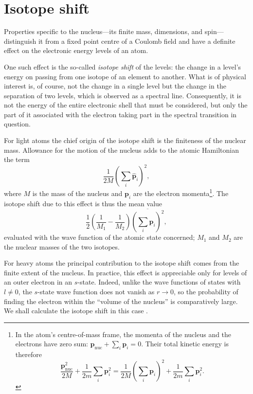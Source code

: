 \section{Isotope shift}

Properties specific to the nucleus---its finite mass, dimensions, and spin---
distinguish it from a fixed point centre of a Coulomb field and have a
definite effect on the electronic energy levels of an atom.

One such effect is the so-called \emph{isotope shift} of the levels: the change
in a level's energy on passing from one isotope of an element to another. What
is of physical interest is, of course, not the change in a single level but the
change in the separation of two levels, which is observed as a spectral line.
Consequently, it is not the energy of the entire electronic shell that must be
considered, but only the part of it associated with the electron taking part in
the spectral transition in question.

For light atoms the chief origin of the isotope shift is the finiteness of the
nuclear mass. Allowance for the motion of the nucleus adds to the atomic
Hamiltonian the term
\[
 \frac1{2M}\left(\sum_i\hat{\mathbf p}_i\right)^2,
\]
where $M$ is the mass of the nucleus and $\mathbf p_i$ are the electron
momenta\footnote{In the atom's centre-of-mass frame, the momenta of the nucleus
and the electrons have zero sum:
$\mathbf p_{\mathrm{nuc}}+\sum_i\mathbf p_i=0$. Their total kinetic energy is
therefore
\[
 \frac{\mathbf p_{\mathrm{nuc}}^2}{2M}+
 \frac1{2m}\sum_i\mathbf p_i^2
 =\frac1{2M}\left(\sum_i\mathbf p_i\right)^2
 +\frac1{2m}\sum_i\mathbf p_i^2.
\]
}. The isotope shift due to this effect is thus the mean value
\begin{equation}
 \frac12\left(\frac1{M_1}-\frac1{M_2}\right)
 \overline{\left(\sum_i\mathbf p_i\right)^2},
 \tag{120.1}
\end{equation}
evaluated with the wave function of the atomic state concerned; $M_1$ and
$M_2$ are the nuclear masses of the two isotopes.

For heavy atoms the principal contribution to the isotope shift comes from the
finite extent of the nucleus. In practice, this effect is appreciable only for
levels of an outer electron in an $s$-state. Indeed, unlike the wave functions
of states with $l\ne0$, the $s$-state wave function does not vanish as
$r\to0$, so the probability of finding the electron within the ``volume of
the nucleus'' is comparatively large. We shall calculate the isotope shift in
this case\unskip
.

